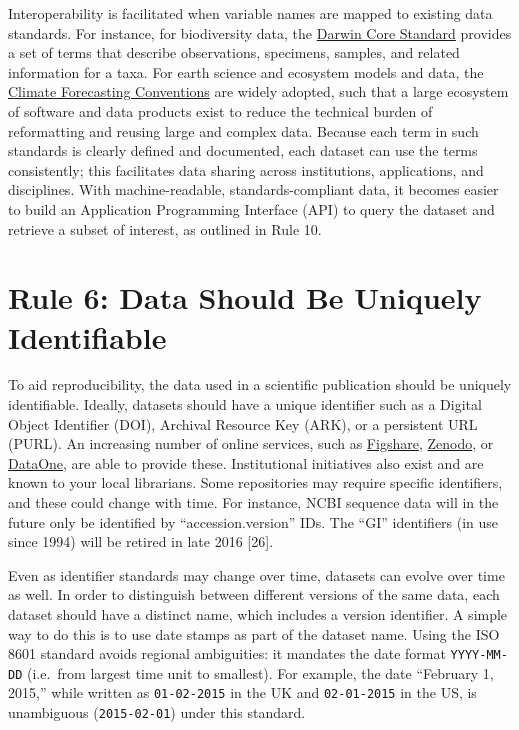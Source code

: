 \documentclass[10pt,letterpaper]{article}
\begin{document}
Interoperability is facilitated when variable names are mapped to
existing data standards. For instance, for biodiversity data, the
\href{http://www.tdwg.org/standards/450/}{Darwin Core Standard} provides
a set of terms that describe observations, specimens, samples, and
related information for a taxa. For earth science and ecosystem models
and data, the \href{https://cfconventions.org}{Climate Forecasting
Conventions} are widely adopted, such that a large ecosystem of software
and data products exist to reduce the technical burden of reformatting
and reusing large and complex data. Because each term in such standards
is clearly defined and documented, each dataset can use the terms
consistently; this facilitates data sharing across institutions,
applications, and disciplines. With machine-readable,
standards-compliant data, it becomes easier to build an Application
Programming Interface (API) to query the dataset and retrieve a subset
of interest, as outlined in Rule 10.

\section*{Rule 6: Data Should Be Uniquely
Identifiable}\label{rule-6-data-should-be-uniquely-identifiable}

To aid reproducibility, the data used in a scientific publication should
be uniquely identifiable. Ideally, datasets should have a unique
identifier such as a Digital Object Identifier (DOI), Archival Resource
Key (ARK), or a persistent URL (PURL). An increasing number of online
services, such as \href{http://figshare.com/}{Figshare},
\href{http://zenodo.org}{Zenodo}, or
\href{http://www.dataone.org}{DataOne}, are able to provide these.
Institutional initiatives also exist and are known to your local
librarians. Some repositories may require specific identifiers, and
these could change with time. For instance, NCBI sequence data will in
the future only be identified by ``accession.version'' IDs. The ``GI''
identifiers (in use since 1994) will be retired in late 2016 {[}26{]}.

Even as identifier standards may change over time, datasets can evolve
over time as well. In order to distinguish between different versions of
the same data, each dataset should have a distinct name, which includes
a version identifier. A simple way to do this is to use date stamps as
part of the dataset name. Using the ISO 8601 standard avoids regional
ambiguities: it mandates the date format \texttt{YYYY-MM-DD} (i.e.~from
largest time unit to smallest). For example, the date ``February 1,
2015,'' while written as \texttt{01-02-2015} in the UK and
\texttt{02-01-2015} in the US, is unambiguous (\texttt{2015-02-01})
under this standard.
\end{document}
